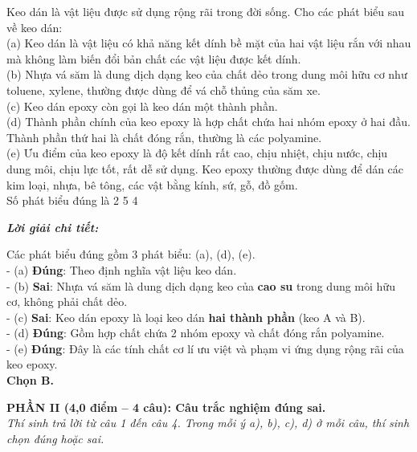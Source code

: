 \documentclass[11pt,a4paper]{article}
\def\loigiai#1{
\par\begingroup\color{blue!80!black}\small
\noindent\textbf{\textit{Lời giải chi tiết:}}\par
#1\par\endgroup}
\begin{document}
\begin{ex}
Keo dán là vật liệu được sử dụng rộng rãi trong đời sống. Cho các phát biểu sau về keo dán:\\
(a) Keo dán là vật liệu có khả năng kết dính bề mặt của hai vật liệu rắn với nhau mà không làm biến đổi bản chất các vật liệu được kết dính.\\
(b) Nhựa vá săm là dung dịch dạng keo của chất dẻo trong dung môi hữu cơ như toluene, xylene, thường được dùng để vá chỗ thủng của săm xe.\\
(c) Keo dán epoxy còn gọi là keo dán một thành phần.\\
(d) Thành phần chính của keo epoxy là hợp chất chứa hai nhóm epoxy ở hai đầu. Thành phần thứ hai là chất đóng rắn, thường là các polyamine.\\
(e) Ưu điểm của keo epoxy là độ kết dính rất cao, chịu nhiệt, chịu nước, chịu dung môi, chịu lực tốt, rất dễ sử dụng. Keo epoxy thường được dùng để dán các kim loại, nhựa, bê tông, các vật bằng kính, sứ, gỗ, đồ gốm.\\
Số phát biểu đúng là
\choice
{2}
{}
{5}
{4}
\loigiai{
Các phát biểu đúng gồm 3 phát biểu: (a), (d), (e).\\
- (a) \textbf{Đúng}: Theo định nghĩa vật liệu keo dán.\\
- (b) \textbf{Sai}: Nhựa vá săm là dung dịch dạng keo của \textbf{cao su} trong dung môi hữu cơ, không phải chất dẻo.\\
- (c) \textbf{Sai}: Keo dán epoxy là loại keo dán \textbf{hai thành phần} (keo A và B).\\
- (d) \textbf{Đúng}: Gồm hợp chất chứa 2 nhóm epoxy và chất đóng rắn polyamine.\\
- (e) \textbf{Đúng}: Đây là các tính chất cơ lí ưu việt và phạm vi ứng dụng rộng rãi của keo epoxy.\\
\textbf{Chọn B.}}
\end{ex}



\noindent
\textbf{PHẦN II (4,0 điểm -- 4 câu): Câu trắc nghiệm đúng sai.}\\
\textit{Thí sinh trả lời từ câu 1 đến câu 4. Trong mỗi ý a), b), c), d) ở mỗi câu, thí sinh chọn đúng hoặc sai.}

\setcounter{ex}{0}
\end{document}

